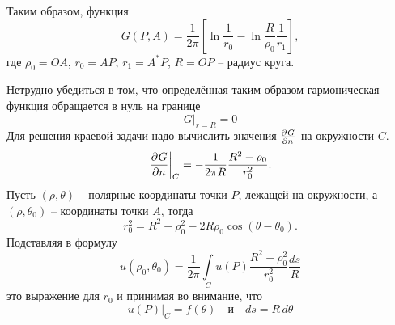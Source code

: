 Таким образом, функция 
\begin{equation}
 	G(P, A) = \frac{1}{2 \pi} \left[ \ln \frac{1}{r_0} - \ln \frac{R}{\rho_0} \frac{1}{r_1} \right],
\end{equation}
где  $\rho_0 = OA$, $r_0 = AP$, $r_1 = A^*P$, $R = OP$ -- радиус круга.
%

Нетрудно убедиться в том, что определённая таким образом гармоническая функция обращается в нуль на границе
\[
	G|_{r = R} = 0
\]
Для решения краевой задачи надо вычислить значения $\frac{\partial^{}G}{\partial n^{}}$ на окружности $C$.
\[
	\left.\frac{\partial^{}G}{\partial n^{}}\right|_C = - \frac{1}{2 \pi R} \frac{R^2 - \rho_0}{r_0^2}.
\]
Пусть $(\rho, \theta)$ -- полярные координаты точки $P$, лежащей на окружности, а $(\rho, \theta_0)$ -- координаты точки $A$, тогда
\[
	r_0^2 = R^2 + \rho_0^2 - 2 R \rho_0 \cos (\theta - \theta_0).
\]
Подставляя в формулу 
\[
	u(\rho_0, \theta_0) = \frac{1}{2 \pi} \int\limits_C u(P) \frac{R^2 - \rho_0^2}{r_0^2} \frac{ds}{R}
\]
это выражение для $r_0$ и принимая во внимание, что 
\[
	u(P) \big|_C = f(\theta) \quad \mbox{и} \quad ds = R\, d\theta
\]

